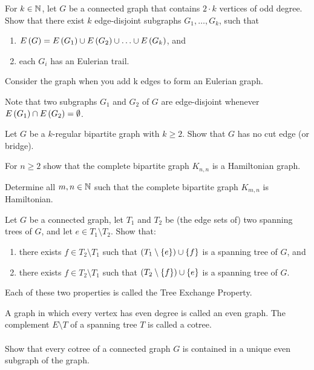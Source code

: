 \documentclass{article}
\begin{document}
\begin{exercise}
For $k\in\mathbb{N}$, let $G$ be a connected graph that contains $2\cdot k$ vertices of odd degree. Show that there exist $k$ edge-disjoint subgraphs $G_1,\ldots,G_k$, such that
\begin{enumerate}
 \item $E\left( G \right)=E\left( G_1 \right)\cup E\left( G_2 \right)\cup\ldots\cup E\left( G_k \right)$, and
 \item each $G_i$ has an Eulerian trail.
\end{enumerate}
\begin{hint}
Consider the graph when you add k edges to form an Eulerian graph.
\end{hint}
\begin{note}
Note that two subgraphs $G_1$ and $G_2$ of $G$ are edge-disjoint whenever $E\left( G_1 \right)\cap E\left( G_2 \right)=\emptyset$.
\end{note}
\end{exercise}

\begin{exercise}
Let $G$ be a $k$-regular bipartite graph with $k\geq2$. Show that $G$ has no cut edge (or bridge).
\end{exercise}

\begin{exercise}
For $n\geq2$ show that the complete bipartite graph $K_{n,n}$ is a Hamiltonian graph.
\end{exercise}

\begin{exercise}
Determine all $m,n\in\mathbb{N}$ such that the complete bipartite graph $K_{m,n}$ is Hamiltonian.
\end{exercise}

\begin{exercise}
Let $G$ be a connected graph, let $T_1$ and $T_2$ be (the edge sets of) two spanning trees of $G$, and let $e\in T_1\setminus T_2$. Show that:
\begin{enumerate}
 \item there exists $f\in T_2\setminus T_1$ such that $\left( T_1\setminus\left\{ e \right\} \right)\cup\left\{ f \right\}$ is a spanning tree of $G$, and
 \item there exists $f\in T_2\setminus T_1$ such that $\left( T_2\setminus\left\{ f \right\} \right)\cup\left\{ e \right\}$ is a spanning tree of $G$.
\end{enumerate}
\begin{note}
Each of these two properties is called the Tree Exchange Property.
\end{note}
\end{exercise}

\begin{exercise}
A graph in which every vertex has even degree is called an even graph. The complement $E\setminus T$ of a spanning tree $T$ is called a cotree.
\paragraph{}
Show that every cotree of a connected graph $G$ is contained in a unique even subgraph of the graph.
\end{exercise}
\end{document}
